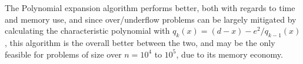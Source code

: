 \documentclass[]{article}
\begin{document}
The Polynomial expansion algorithm performs better, both with regards to time and memory use, and since over/underflow problems can be largely mitigated by calculating the characteristic polynomial with $q_k(x) = (d-x) - e^2/q_{k-1}(x)$, this algorithm is the overall better between the two, and may be the only feasible for problems of size over $n = 10^4$ to $10^5$, due to its memory economy.



\end{document}
